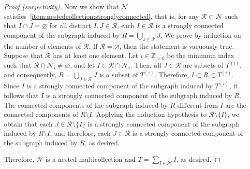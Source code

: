 \documentclass[11pt]{article}
\theoremstyle{definition}
\numberwithin{equation}{section}
\newcommand{\positiveintegers}{\mathbb{Z}_{>0}}
\newcommand{\mtp}[1]{^{(#1)}} \newcommand{\graph}{\varGamma}
\begin{document}
\begin{proof}[Proof (surjectivity)]
    Now we show that \(\mathcal{N}\) satisfies~\ref{item:nestedcollection:stronglyconnected},
    that is, for any \(\mathcal{R} \subset \mathcal{N}\) such that \(I \cap J = \varnothing\) for all distinct \(I, J \in \mathcal{R}\),
    each \(I \in \mathcal{R}\) is a strongly connected component of the subgraph induced by \(R = \bigcup_{J \in \mathcal{R}} J\).
    We prove by induction on the number of elements of \(\mathcal{R}\).
    If \(\mathcal{R} = \varnothing\), then the statement is vacuously true.
    Suppose that \(\mathcal{R}\) has at least one element.
    Let \(i \in \positiveintegers\) be the minimum index such that \(\mathcal{R} \cap \mathcal{N}_i \neq \varnothing\), and let \(I \in \mathcal{R} \cap \mathcal{N}_i\).
    Then, all \(J \in \mathcal{R}\) are subsets of \(T\mtp{i}\), and consequently, \(R = \bigcup_{J \in \mathcal{R}} J\) is a subset of \(T\mtp{i}\).
    Therefore, \(I \subset R \subset T\mtp{i}\).
    Since \(I\) is a strongly connected component of the subgraph induced by \(T\mtp{i}\), it follows that \(I\) is a strongly connected component of the subgraph induced by \(R\).
    The connected components of the subgraph induced by \(R\) different from \(I\) are the connected components of \(R \setminus I\).
    Applying the induction hypothesis to \(\mathcal{R} \setminus \{I\}\), we obtain that each \(J \in \mathcal{R} \setminus \{I\}\) is a strongly connected component of the subgraph induced by \(R \setminus I\), and therefore, each \(J \in \mathcal{R}\) is a strongly connected component of the subgraph induced by \(R\), as desired.

    Therefore, \(\mathcal{N}\) is a nested multicollection and \(T = \sum_{I \in \mathcal{N}} I\), as desired.
\end{proof}
\end{document}
